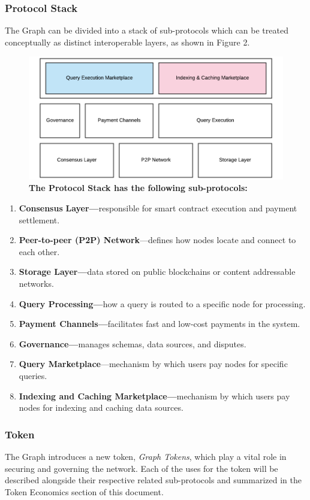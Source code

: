 \documentclass[12pt]{article}
\begin{document}
\subsubsection*{Protocol Stack}
The Graph can be divided into a stack of sub-protocols which can be treated conceptually as distinct interoperable layers, as shown in Figure 2.
\begin{figure}[H]
\vspace*{5mm}
\caption{\textbf{The Protocol Stack has the following sub-protocols:}}
\begin{center}
\includegraphics[width=.85  \textwidth]{media/image7.png}
\end{center}
\end{figure}
\begin{enumerate}
\item \textbf{Consensus} \textbf{Layer---}responsible for smart contract execution and payment settlement.
\item \textbf{Peer-to-peer (P2P) Network}---defines how nodes locate and connect to each other.
\item \textbf{Storage Layer---}data stored on public blockchains or content addressable networks.
\item \textbf{Query Processing---}how a query is routed to a specific node for processing.
\item \textbf{Payment Channels---}facilitates fast and low-cost payments in the system.
\item \textbf{Governance---}manages schemas, data sources, and disputes.
\item \textbf{Query Marketplace}---mechanism by which users pay nodes for specific queries.
\item \textbf{Indexing and Caching Marketplace---}mechanism by which users pay nodes for indexing and caching data sources.
\end{enumerate}
\subsubsection*{Token}
The Graph introduces a new token, \textit{Graph Tokens}, which play a vital role in securing and governing the network. Each of the uses for the token will be described alongside their respective related sub-protocols and summarized in the Token Economics section of this document.
\end{document}
